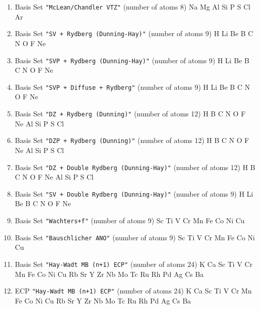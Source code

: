 \begin{enumerate}
\item Basis Set \verb#"McLean/Chandler VTZ"# (number of atoms 8)  \newline 
  Na Mg Al Si P S Cl Ar


\item Basis Set \verb#"SV + Rydberg (Dunning-Hay)"# (number of atoms 9)  \newline 
  H Li Be B C N O F Ne


\item Basis Set \verb#"SVP + Rydberg (Dunning-Hay)"# (number of atoms 9)  \newline 
  H Li Be B C N O F Ne


\item Basis Set \verb#"SVP + Diffuse + Rydberg"# (number of atoms 9)  \newline 
  H Li Be B C N O F Ne


\item Basis Set \verb#"DZ + Rydberg (Dunning)"# (number of atoms 12)  \newline 
  H B C N O F Ne Al Si P S Cl


\item Basis Set \verb#"DZP + Rydberg (Dunning)"# (number of atoms 12)  \newline 
  H B C N O F Ne Al Si P S Cl


\item Basis Set \verb#"DZ + Double Rydberg (Dunning-Hay)"# (number of atoms 12)  \newline 
  H B C N O F Ne Al Si P S Cl


\item Basis Set \verb#"SV + Double Rydberg (Dunning-Hay)"# (number of atoms 9)  \newline 
  H Li Be B C N O F Ne


\item Basis Set \verb#"Wachters+f"# (number of atoms 9)  \newline 
  Sc Ti V Cr Mn Fe Co Ni Cu


\item Basis Set \verb#"Bauschlicher ANO"# (number of atoms 9)  \newline 
  Sc Ti V Cr Mn Fe Co Ni Cu


\item Basis Set \verb#"Hay-Wadt MB (n+1) ECP"# (number of atoms 24)  \newline 
  K Ca Sc Ti V Cr Mn Fe Co Ni Cu Rb Sr Y Zr Nb Mo Tc Ru Rh Pd Ag Cs Ba


\item ECP \verb#"Hay-Wadt MB (n+1) ECP"# (number of atoms 24)  \newline 
  K Ca Sc Ti V Cr Mn Fe Co Ni Cu Rb Sr Y Zr Nb Mo Tc Ru Rh Pd Ag Cs Ba



\end{enumerate}
